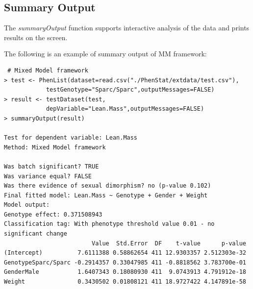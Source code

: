 \documentclass[12pt,a4paper]{article}
\begin{document}
\subsection{Summary Output}
The \textit{summaryOutput} function supports interactive analysis of the data and prints results on the screen.

The following is an example of summary output of MM framework:
\begingroup
    \fontsize{8pt}{12pt}\selectfont
\begin{verbatim}
 # Mixed Model framework
> test <- PhenList(dataset=read.csv("./PhenStat/extdata/test.csv"),
            testGenotype="Sparc/Sparc",outputMessages=FALSE)
> result <- testDataset(test,
            depVariable="Lean.Mass",outputMessages=FALSE)
> summaryOutput(result)

Test for dependent variable: Lean.Mass
Method: Mixed Model framework

Was batch significant? TRUE
Was variance equal? FALSE
Was there evidence of sexual dimorphism? no (p-value 0.102)
Final fitted model: Lean.Mass ~ Genotype + Gender + Weight
Model output:
Genotype effect: 0.371508943
Classification tag: With phenotype threshold value 0.01 - no significant change
                         Value  Std.Error  DF    t-value      p-value
(Intercept)          7.6111388 0.58862654 411 12.9303357 2.512303e-32
GenotypeSparc/Sparc -0.2914357 0.33047985 411 -0.8818562 3.783700e-01
GenderMale           1.6407343 0.18080930 411  9.0743913 4.791912e-18
Weight               0.3430502 0.01808121 411 18.9727422 4.147891e-58
\end{verbatim}
\endgroup
\end{document}

